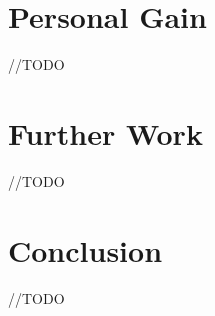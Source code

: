 \documentclass[12pt,twoside,a4paper]{report}
\begin{document}
\section{Personal Gain}\label{7.3}
//TODO

\section{Further Work}\label{7.4}
//TODO

\section{Conclusion}\label{7.5}
//TODO
\end{document}
